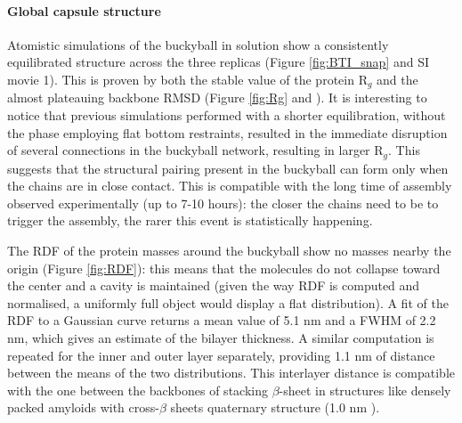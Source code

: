 \paragraph{Global capsule structure} Atomistic simulations of the buckyball in solution show a consistently equilibrated structure across the three replicas (Figure \ref{fig:BTI_snap} and SI movie 1).
%
This is proven by both the stable value of the protein R$_g$ and the almost plateauing backbone RMSD (Figure \ref{fig:Rg} and ). It is interesting to notice that previous simulations performed with a shorter equilibration, without the phase employing flat bottom restraints, resulted in the immediate disruption of several connections in the buckyball network, resulting in larger R$_g$. This suggests that the structural pairing present in the buckyball can form only when the chains are in close contact. This is compatible with the long time of assembly observed experimentally (up to 7-10 hours): the closer the chains need to be to trigger the assembly, the rarer this event is statistically happening.

The RDF of the protein masses around the buckyball show no masses nearby the origin (Figure \ref{fig:RDF}): this means that the molecules do not collapse toward the center and a cavity is maintained (given the way RDF is computed and normalised, a uniformly full object would display a flat distribution).
%
A fit of the RDF to a Gaussian curve returns a mean value of 5.1 nm and a FWHM of 2.2 nm, which gives an estimate of the bilayer thickness.
%
A similar computation is repeated for the inner and outer layer separately, providing 1.1 nm of distance between the means of the two distributions. This interlayer distance is compatible with the one between the backbones of stacking $\beta$-sheet in structures like densely packed amyloids with cross-$\beta$ sheets quaternary structure (1.0 nm \citep{Sunde1997}).

